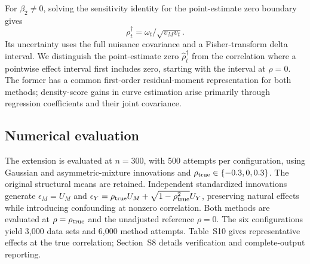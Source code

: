 For $\beta_2\ne0$, solving the sensitivity identity for the point-estimate zero boundary gives
\[
\rho_t^\dagger=\omega_t/\sqrt{v_Mv_t}.
\]
Its uncertainty uses the full nuisance covariance and a Fisher-transform delta interval. We distinguish the point-estimate zero $\widehat\rho_t^\dagger$ from the correlation where a pointwise effect interval first includes zero, starting with the interval at $\rho=0$. The former has a common first-order residual-moment representation for both methods; density-score gains in curve estimation arise primarily through regression coefficients and their joint covariance.

\subsection{Numerical evaluation}

The extension is evaluated at $n=300$, with 500 attempts per configuration, using Gaussian and asymmetric-mixture innovations and $\rho_{\rm true}\in\{-0.3,0,0.3\}$. The original structural means are retained. Independent standardized innovations generate $\epsilon_M=U_M$ and $\epsilon_Y=\rho_{\rm true}U_M+\sqrt{1-\rho_{\rm true}^2}U_Y$, preserving natural effects while introducing confounding at nonzero correlation. Both methods are evaluated at $\rho=\rho_{\rm true}$ and the unadjusted reference $\rho=0$. The six configurations yield 3,000 data sets and 6,000 method attempts. Table~S10 gives representative effects at the true correlation; Section~S8 details verification and complete-output reporting.



